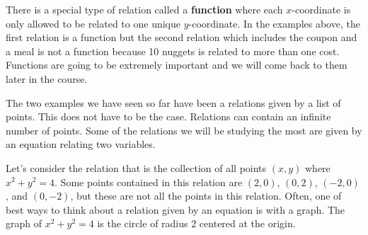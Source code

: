 \documentclass{ximera}
\begin{document}
\begin{tcolorbox}[colback=blue!5]
\begin{remark}
There is a special type of relation called a \textbf{function} where each $x$-coordinate is only allowed to be related to one unique $y$-coordinate.  In the examples above, the first relation is a function but the second relation which includes the coupon and a meal is not a function because 10 nuggets is related to more than one cost.  Functions are going to be extremely important and we will come back to them later in the course.
\end{remark}
\end{tcolorbox}

The two examples we have seen so far have been a relations given by a list of points.  This does not have to be the case.  Relations can contain an infinite number of points.  Some of the relations we will be studying the most are given by an equation relating two variables.

\begin{example}
Let's consider the relation that is the collection of all points $(x,y)$ where $x^2+y^2=4$.  Some points contained in this relation are $(2,0)$, $(0,2)$, $(-2,0)$, and $(0,-2)$, but these are not all the points in this relation.  Often, one of best ways to think about a relation given by an equation is with a graph.  The graph of $x^2+y^2=4$ is the circle of radius 2 centered at the origin.



\end{example}
\end{document}

